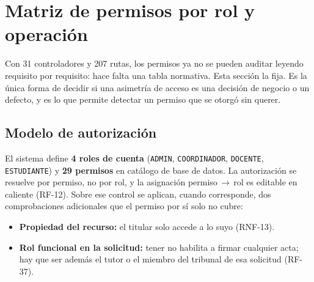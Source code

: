 \documentclass[11pt,a4paper]{article}
\DeclareRobustCommand{\cd}[1]{\texttt{\protect\seqsplit{#1}}}
\begin{document}
\noindent{}

\section{Matriz de permisos por rol y operación}
\label{sec:permisos}

Con 31 controladores y 207 rutas, los permisos ya no se pueden auditar leyendo requisito por
requisito: hace falta una tabla normativa. Esta sección la fija. Es la única forma de decidir si
una asimetría de acceso es una decisión de negocio o un defecto, y es lo que permite detectar un
permiso que se otorgó sin querer.

\subsection{Modelo de autorización}

El sistema define \textbf{4 roles de cuenta} (\texttt{ADMIN}, \texttt{COORDINADOR},
\texttt{DOCENTE}, \texttt{ESTUDIANTE}) y \textbf{29 permisos} en catálogo de base de datos. La
autorización se resuelve por permiso, no por rol, y la asignación permiso\,$\rightarrow$\,rol es
editable en caliente (RF-12). Sobre ese control se aplican, cuando corresponde, dos
comprobaciones adicionales que el permiso por sí solo no cubre:

\begin{itemize}
    \item \textbf{Propiedad del recurso:} el titular solo accede a lo suyo (RNF-13).
    \item \textbf{Rol funcional en la solicitud:} tener \cd{ACTA\_FIRMAR} no habilita a
          firmar cualquier acta; hay que ser además el tutor o el miembro del tribunal de esa
          solicitud (RF-37).
\end{itemize}
\end{document}
